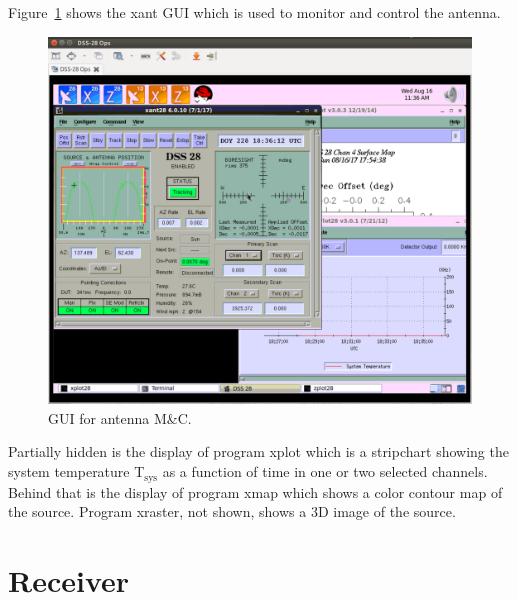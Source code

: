\documentclass[letterpaper,11pt]{report}
\begin{document}
Figure~\ref{fig:xant} shows the {\ttfamily xant} GUI which is used to monitor
and control the antenna.
\begin{figure}[h!tb]
    \begin{center}
        \includegraphics[width=4.5in]{DSS-28_Ops_168.png}
        \caption{\label{fig:xant}GUI for antenna M\&C.}
    \end{center}
\end{figure}
Partially hidden is the display of program {\ttfamily xplot} which is a
stripchart showing the system temperature T$_{\mbox{sys}}$ as a function of time
in one or two selected channels. Behind that is the display of program 
{\ttfamily xmap} which shows a color contour map of the source. Program 
{\ttfamily xraster}, not shown, shows a 3D image of the source.

\section{Receiver}
\end{document}
